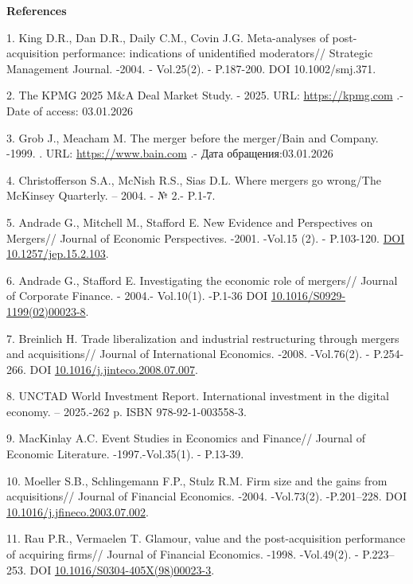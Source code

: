 \begin{center}
{\bfseries References}
\end{center}

\begin{refs}
1. King D.R., Dan D.R., Daily C.M., Covin J.G. Meta-analyses of
post-acquisition performance: indications of unidentified moderators//
Strategic Management Journal. -2004. - Vol.25(2). - P.187-200. DOI
10.1002/smj.371.

2. The KPMG 2025 M\&A Deal Market Study. - 2025. URL:
\href{https://kpmg.com/us/en/articles/2025/2025-ma-deal-market-study.html}{https://kpmg.com} .-
Date of access: 03.01.2026

3. Grob J., Meacham M. The merger before the merger/Bain and Company.
-1999. . URL:
\href{https://www.bain.com/contentassets/afa083a686c847d58c7fef8e6d0ef379/bb\_merger\_before\_the\_merger.pdf}{https://www.bain.com} .- Дата обращения:03.01.2026

4. Christofferson S.A., McNish R.S., Sias D.L. Where mergers go
wrong/The McKinsey Quarterly. -- 2004. - № 2.- P.1-7.

5. Andrade G., Mitchell M., Stafford E. New Evidence and Perspectives on
Mergers// Journal of Economic Perspectives. -2001. -Vol.15 (2). -
P.103-120. \href{https://doi.org/10.1257/jep.15.2.103}{DOI
10.1257/jep.15.2.103}.

6. Andrade G., Stafford E. Investigating the economic role of mergers//
Journal of Corporate Finance. - 2004.- Vol.10(1). -P.1-36 DOI
\href{https://doi.org/10.1016/S0929-1199(02)00023-8}{10.1016/S0929-1199(02)00023-8}.

7. Breinlich H. Trade liberalization and industrial restructuring
through mergers and acquisitions// Journal of International Economics.
-2008. -Vol.76(2). - P.254-266. DOI
\href{https://doi.org/10.1016/j.jinteco.2008.07.007}{10.1016/j.jinteco.2008.07.007}.

8. UNCTAD World Investment Report. International investment in the
digital economy. -- 2025.-262 p. ISBN 978-92-1-003558-3.

9. MacKinlay A.C. Event Studies in Economics and Finance// Journal of
Economic Literature. -1997.-Vol.35(1). - P.13-39.

10. Moeller S.B., Schlingemann F.P., Stulz R.M. Firm size and the gains
from acquisitions// Journal of Financial Economics. -2004. -Vol.73(2).
-P.201--228. DOI
\href{https://doi.org/10.1016/j.jfineco.2003.07.002}{10.1016/j.jfineco.2003.07.002}.

11. Rau P.R., Vermaelen T. Glamour, value and the post-acquisition
performance of acquiring firms// Journal of Financial Economics. -1998.
-Vol.49(2). - P.223--253. DOI
\href{https://doi.org/10.1016/S0304-405X(98)00023-3}{10.1016/S0304-405X(98)00023-3}.


\end{refs}
